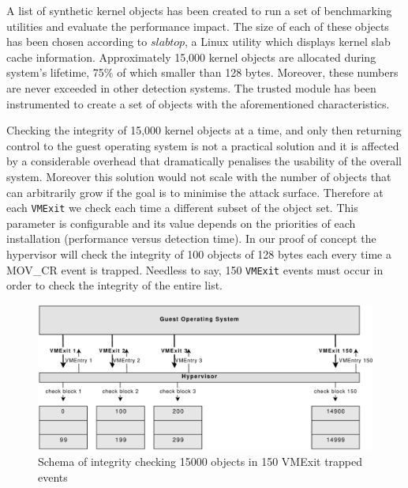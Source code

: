 %
%
A list of synthetic kernel objects has been created to run a set of benchmarking utilities and evaluate the performance impact. The size of each of these objects has been chosen according to $slabtop$, a Linux utility which displays kernel slab cache information. Approximately 15,000 kernel objects are allocated during system's lifetime, 75\% of which smaller than 128 bytes. Moreover, these numbers are never exceeded in other detection systems.
The trusted module has been instrumented to create a set of objects with the aforementioned characteristics. 

Checking the integrity of 15,000 kernel objects at a time, and only then returning control to the guest operating system is not a practical solution and it is affected by a considerable overhead that dramatically penalises the usability of the overall system. Moreover this solution would not scale with the number of objects that can arbitrarily grow if the goal is to minimise the attack surface. Therefore at each \texttt{VMExit} we check each time a different subset of the object set. This parameter is configurable and its value depends on the priorities of each installation (performance versus detection time). 
In our proof of concept the hypervisor will check the integrity of 100 objects of 128 bytes each every time a MOV\_CR event is trapped. Needless to say, 150 \texttt{VMExit} events must occur in order to check the integrity of the entire list.

\begin{figure}[htbp] 
\begin{center}
\includegraphics[scale=0.45]{images/hr_relax.pdf}
\caption{{Schema of integrity checking 15000 objects in 150 VMExit trapped events}}
\label{schema_hr_relax}
\end{center}
\end{figure}

